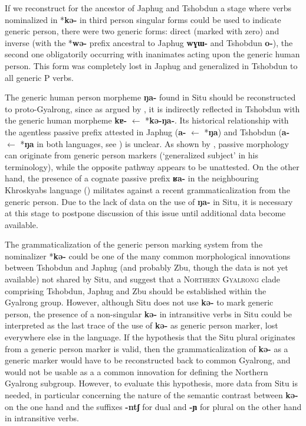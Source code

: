 \documentclass[oneside,a4paper,11pt]{article}
\newcommand{\ipa}[1]{\textbf{\phon\mbox{#1}}} %
\begin{document}
If we reconstruct for the ancestor of Japhug and Tshobdun a stage where verbs nominalized in *\ipa{kə-} in third person singular forms could be used to indicate generic person, there were two generic forms: direct (marked with zero) and inverse (with the *\ipa{wə-} prefix ancestral to Japhug \ipa{wɣɯ-} and Tshobdun \ipa{o-}), the second one obligatorily occurring with inanimates acting upon the generic human person. This form was completely lost in Japhug and generalized in Tshobdun to all generic P verbs.

The generic human person morpheme \ipa{ŋa-} found in Situ should be reconstructed to proto-Gyalrong, since as argued by  \citet[244]{sun14generic}, it is indirectly reflected in Tshobdun with the generic human morpheme \ipa{kɐ-} $\leftarrow$ *\ipa{kə-ŋa-}. Its historical relationship with the  agentless passive prefix attested in Japhug  (\ipa{a-} $\leftarrow$ *\ipa{ŋa}) and Tshobdun (\ipa{a-} $\leftarrow$ *\ipa{ŋa} in both languages, see \citealt{jacques12demotion}) is unclear. As shown by \citet[49-50]{haspelmath90passive}, passive morphology can originate from generic person markers (`generalized subject' in his terminology), while the opposite pathway appears to be unattested. On the other hand, the presence of a cognate passive prefix \ipa{ʁa-} in the neighbouring Khroskyabs language (\citealt[152-154]{lai13affixale}) militates against a recent grammaticalization from the generic person. Due to the lack of data on the use of \ipa{ŋa-} in Situ, it is necessary at this stage to postpone discussion of this issue until additional data become available.


The grammaticalization of the generic person marking system from the nominalizer *\ipa{kə-} could be one of the many common morphological innovations between Tshobdun and Japhug (and probably Zbu, though the data is not yet available) not shared by Situ, and suggest that a \textsc{Northern Gyalrong} clade comprising Tshobdun, Japhug and Zbu should be established within the Gyalrong group. However, although Situ does not use \ipa{kə-} to mark generic person,  the presence of a non-singular \ipa{kə-} in intransitive verbs in Situ could be interpreted as the last trace of the use of \ipa{kə-} as generic person marker, lost everywhere else in the language. If the hypothesis that the Situ plural originates from a generic person marker is valid, then the grammaticalization  of \ipa{kə-} as a generic marker would have to be reconstructed back to common Gyalrong, and would not be usable as a a common innovation for defining the Northern Gyalrong subgroup. However, to evaluate  this hypothesis, more data from Situ is needed, in particular concerning the nature of the semantic contrast between \ipa{kə-} on the one hand and the suffixes \ipa{-ntʃ} for dual and \ipa{-ɲ} for plural on the other hand in intransitive verbs.
\end{document}
